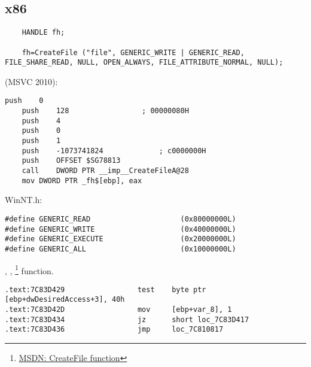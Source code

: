 \subsection{x86}


\begin{lstlisting}
	HANDLE fh;

	fh=CreateFile ("file", GENERIC_WRITE | GENERIC_READ, FILE_SHARE_READ, NULL, OPEN_ALWAYS, FILE_ATTRIBUTE_NORMAL, NULL);
\end{lstlisting}

 (MSVC 2010):

\begin{lstlisting}[caption=MSVC 2010]
	push	0
	push	128					; 00000080H
	push	4
	push	0
	push	1
	push	-1073741824				; c0000000H
	push	OFFSET $SG78813
	call	DWORD PTR __imp__CreateFileA@28
	mov	DWORD PTR _fh$[ebp], eax
\end{lstlisting}

 WinNT.h:

\begin{lstlisting}[caption=WinNT.h]
#define GENERIC_READ                     (0x80000000L)
#define GENERIC_WRITE                    (0x40000000L)
#define GENERIC_EXECUTE                  (0x20000000L)
#define GENERIC_ALL                      (0x10000000L)
\end{lstlisting}

, 
, 
 \footnote{\href{http://go.yurichev.com/17065}{MSDN: CreateFile function}} function.



\begin{lstlisting}[caption=KERNEL32.DLL (Windows XP SP3 x86)]
.text:7C83D429                 test    byte ptr [ebp+dwDesiredAccess+3], 40h
.text:7C83D42D                 mov     [ebp+var_8], 1
.text:7C83D434                 jz      short loc_7C83D417
.text:7C83D436                 jmp     loc_7C810817
\end{lstlisting}

